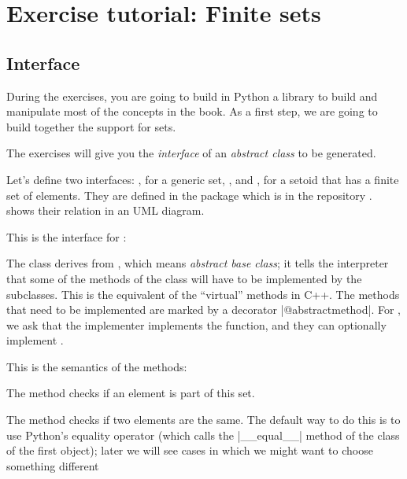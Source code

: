 

\section{Exercise tutorial: Finite sets}\label{sec:exercise-tutorial}

\subsection*{Interface}

During the exercises, you are going to build in Python a library to build and manipulate most of the concepts in the book.
As a first step, we are going to build together the support for sets.

The exercises will give you the \emph{interface} of an \emph{abstract class} to be generated.

Let's define two interfaces: , for a generic set, , and , for a setoid that has a finite set of elements.
They are defined in the package  which is in the repository .
 shows their relation in an UML diagram.

\begin{figure}

  \caption{}
  \label{fig:Setoid-inheritance}
\end{figure}

This is the interface for :


The class   derives from , which means \emph{abstract base class}; it tells the interpreter that some of the methods of the class will have to be implemented by the subclasses.
This is the equivalent of the ``virtual'' methods in C++.
The methods that need to be implemented are marked by a decorator \pystr|@abstractmethod|.
For , we ask that the implementer implements the  function, and they can optionally implement .

This is the semantics of the methods:

\begin{compactitem}
  \item The method  checks if an element is part of this set.
  \item The method  checks if two elements are the same. The default way to do this is to use Python's equality operator (which calls the \pystr|__equal__| method of the class of the first object); later we will see cases in which we might want to choose something different
\end{compactitem}



